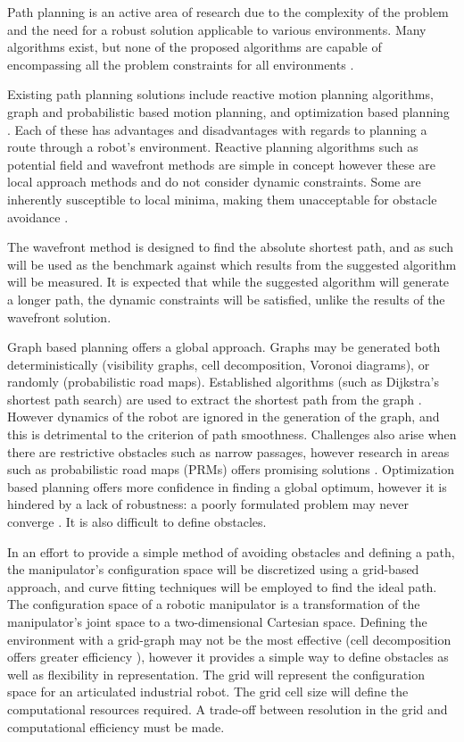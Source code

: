 %
Path planning is an active area of research due to the complexity of the problem and the need for a robust solution applicable to various environments. Many algorithms exist, but none of the proposed algorithms are capable of encompassing all the problem constraints for all environments \cite{sariff06}.

Existing path planning solutions include reactive motion planning algorithms, graph and probabilistic based motion planning, and optimization based planning \cite{waslanderI}. Each of these has advantages and disadvantages with regards to planning a route through a robot's environment. Reactive planning algorithms such as potential field and wavefront methods are simple in concept however these are local approach methods and do not consider dynamic constraints. Some are inherently susceptible to local minima, making them unacceptable for obstacle avoidance \cite{koren91}. 

The wavefront method is designed to find the absolute shortest path, and as such will be used as the benchmark against which results from the suggested algorithm will be measured. It is expected that while the suggested algorithm will generate a longer path, the dynamic constraints will be satisfied, unlike the results of the wavefront solution.

Graph based planning offers a global approach. Graphs may be generated both deterministically (visibility graphs, cell decomposition, Voronoi diagrams), or randomly (probabilistic road maps). Established algorithms (such as Dijkstra's shortest path search) are used to extract the shortest path from the graph \cite{dijkstra59}. However dynamics of the robot are ignored in the generation of the graph, and this is detrimental to the criterion of path smoothness. Challenges also arise when there are restrictive obstacles such as narrow passages, however research in areas such as probabilistic road maps (PRMs) offers promising solutions \cite{hsu03}. Optimization based planning offers more confidence in finding a global optimum, however it is hindered by a lack of robustness: a poorly formulated problem may never converge \cite{waslanderIII}. It is also difficult to define obstacles.

In an effort to provide a simple method of avoiding obstacles and defining a path, the manipulator's configuration space will be discretized using a grid-based approach, and curve fitting techniques will be employed to find the ideal path. The configuration space of a robotic manipulator is a transformation of the manipulator's joint space to a two-dimensional Cartesian space. Defining the environment with a grid-graph may not be the most effective (cell decomposition offers greater efficiency \cite{lingelbach04}), however it provides a simple way to define obstacles as well as flexibility in representation. The grid will represent the configuration space for an articulated industrial robot. The grid cell size will define the computational resources required. A trade-off between resolution in the grid and computational efficiency must be made.

